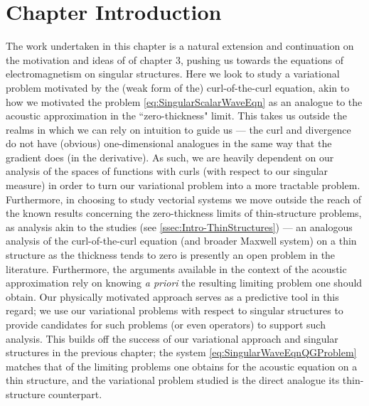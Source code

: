 \section{Chapter Introduction} \label{sec:Curl-Intro}
The work undertaken in this chapter is a natural extension and continuation on the motivation and ideas of of chapter 3, pushing us towards the equations of electromagnetism on singular structures.
Here we look to study a variational problem motivated by the (weak form of the) curl-of-the-curl equation, akin to how we motivated the problem \eqref{eq:SingularScalarWaveEqn} as an analogue to the acoustic approximation in the ``zero-thickness" limit.
This takes us outside the realms in which we can rely on intuition to guide us --- the curl and divergence do not have (obvious) one-dimensional analogues in the same way that the gradient does (in the derivative).
As such, we are heavily dependent on our analysis of the spaces of functions with curls (with respect to our singular measure) in order to turn our variational problem into a more tractable problem.
Furthermore, in choosing to study vectorial systems we move outside the reach of the known results concerning the zero-thickness limits of thin-structure problems, as analysis akin to the studies \cite{kuchment2001convergence, kuchment2003asymptotics, exner2005convergence, post2012spectral} (see \ref{ssec:Intro-ThinStructures}) --- an analogous analysis of the curl-of-the-curl equation (and broader Maxwell system) on a thin structure as the thickness tends to zero is presently an open problem in the literature.
Furthermore, the arguments available in the context of the acoustic approximation rely on knowing \emph{a priori} the resulting limiting problem one should obtain.
Our physically motivated approach serves as a predictive tool in this regard; we use our variational problems with respect to singular structures to provide candidates for such problems (or even operators) to support such analysis.
This builds off the success of our variational approach and singular structures in the previous chapter; the system \eqref{eq:SingularWaveEqnQGProblem} matches that of the limiting problems one obtains for the acoustic equation on a thin structure, and the variational problem studied is the direct analogue its thin-structure counterpart.
%
